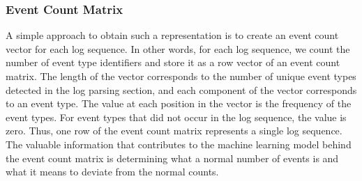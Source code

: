 \begin{figure}[!h] 
\end{figure}

\begin{table}
\centering
{}
\caption{A summary of feature matrix types using in our thesis }\label{tab:embeddings-summary}
\end{table}

\subsubsection*{Event Count Matrix}
A simple approach to obtain such a representation is to create an event count vector for each log sequence. In other words, for each log sequence, we count the number of event type identifiers and store it as a row vector of an event count matrix. The length of the vector corresponds to the number of unique event types detected in the log parsing section, and each component of the vector corresponds to an event type. The value at each position in the vector is the frequency of the event types. For event types that did not occur in the log sequence, the value is zero. Thus, one row of the event count matrix represents a single log sequence. The valuable information that contributes to the machine learning model behind the event count matrix is determining what a normal number of events is and what it means to deviate from the normal counts.



